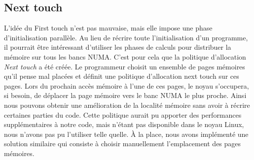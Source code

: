 \subsection{Next touch}
\label{sec:next_touch}
L'idée du First touch n'est pas mauvaise, mais elle impose une phase d'initialisation parallèle.
%
Au lieu de récrire toute l'initialisation d'un programme, il pourrait être intéressant d'utiliser les phases de calculs pour distribuer la mémoire sur tous les bancs NUMA.
%
C'est pour cela que la politique d'allocation {\em Next touch} a été créée.
%
Le programmeur choisit un ensemble de pages mémoires qu'il pense mal placées et définit une politique d'allocation next touch sur ces pages.
%
Lors du prochain accès mémoire à l'une de ces pages, le noyau s'occupera, si besoin, de déplacer la page mémoire vers le banc NUMA le plus proche.
%
Ainsi nous pouvons obtenir une amélioration de la localité mémoire sans avoir à récrire certaines parties du code.
%
Cette politique aurait pu apporter des performances supplémentaires à notre code, mais n'étant pas disponible dans le noyau Linux, nous n'avons pas pu l'utiliser telle quelle.
%
\`A la place, nous avons implémenté une solution similaire qui consiste à choisir manuellement l'emplacement des pages mémoires.
